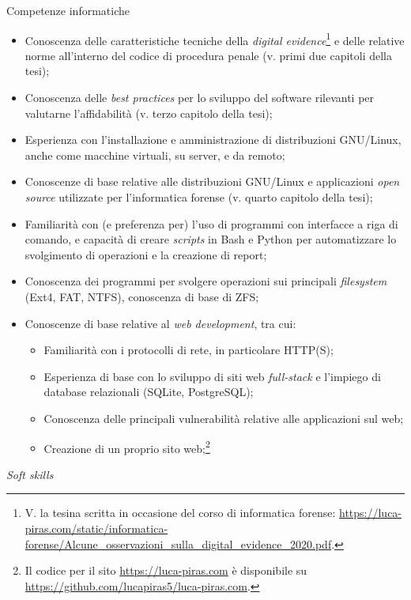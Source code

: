\documentclass[12pt]{article}
\begin{document}
{\Large Competenze informatiche}

\begin{itemize}
\item Conoscenza delle caratteristiche tecniche della \textit{digital evidence}\footnote{V. la tesina scritta in occasione del corso di informatica forense: \url{https://luca-piras.com/static/informatica-forense/Alcune_osservazioni_sulla_digital_evidence_2020.pdf}.} e delle relative norme all'interno del codice di procedura penale (v. primi due capitoli della tesi);
\item Conoscenza delle \textit{best practices} per lo sviluppo del software rilevanti per valutarne l'affidabilità (v. terzo capitolo della tesi);
\item Esperienza con l'installazione e amministrazione di distribuzioni GNU/Linux, anche come macchine virtuali, su server, e da remoto;
\item Conoscenze di base relative alle distribuzioni GNU/Linux e applicazioni \textit{open source} utilizzate per l'informatica forense (v. quarto capitolo della tesi);
\item Familiarità con (e preferenza per) l'uso di programmi con interfacce a riga di comando, e capacità di creare \textit{scripts} in Bash e Python per automatizzare lo svolgimento di operazioni e la creazione di report;
\item Conoscenza dei programmi per svolgere operazioni sui principali \textit{filesystem} (Ext4, FAT, NTFS), conoscenza di base di ZFS;
\item Conoscenze di base relative al \textit{web development}, tra cui:
  \begin{itemize}
  \item Familiarità con i protocolli di rete, in particolare HTTP(S);
  \item Esperienza di base con lo sviluppo di siti web \textit{full-stack} e l'impiego di database relazionali (SQLite, PostgreSQL);
  \item Conoscenza delle principali vulnerabilità relative alle applicazioni sul web;
  \item Creazione di un proprio sito web;\footnote{Il codice per il sito \url{https://luca-piras.com} è disponibile su \url{https://github.com/lucapiras5/luca-piras.com}.}
  \end{itemize}
\end{itemize}

{\Large \textit{Soft skills}}
\end{document}
